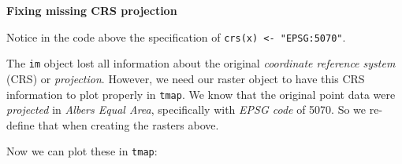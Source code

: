 \documentclass[
]{book}
\newenvironment{Shaded}{\begin{snugshade}}{\end{snugshade}}
\newcommand{\FunctionTok}[1]{\textcolor[rgb]{0.13,0.29,0.53}{\textbf{#1}}}
\newcommand{\NormalTok}[1]{#1}
\newcommand{\OtherTok}[1]{\textcolor[rgb]{0.56,0.35,0.01}{#1}}
\newcommand{\SpecialCharTok}[1]{\textcolor[rgb]{0.81,0.36,0.00}{\textbf{#1}}}
\newcommand{\StringTok}[1]{\textcolor[rgb]{0.31,0.60,0.02}{#1}}
\newenvironment{rmdtip}[1]
  {
  \begin{itemize}
  \renewcommand{\labelitemi}{
    \raisebox{-.7\height}[0pt][0pt]{
      {\setkeys{Gin}{width=3em,keepaspectratio}\texttt{[image: images/\#1]}}
    }
  }
  \setlength{\fboxsep}{1em}
  \begin{tip}
  \item
  }
  {
  \end{tip}
  \end{itemize}
  }
\begin{document}
\begin{Shaded}
\end{Shaded}

\begin{rmdtip}{tip}
\textbf{Fixing missing CRS projection}

Notice in the code above the specification of \texttt{crs(x)\ \textless{}-\ "EPSG:5070"}.

The \texttt{im} object lost all information about the original \emph{coordinate reference system} (CRS) or \emph{projection}. However, we need our raster object to have this CRS information to plot properly in \texttt{tmap}. We know that the original point data were \emph{projected} in \emph{Albers Equal Area}, specifically with \emph{EPSG code} of 5070. So we re-define that when creating the rasters above.

\end{rmdtip}

Now we can plot these in \texttt{tmap}:
\end{document}
